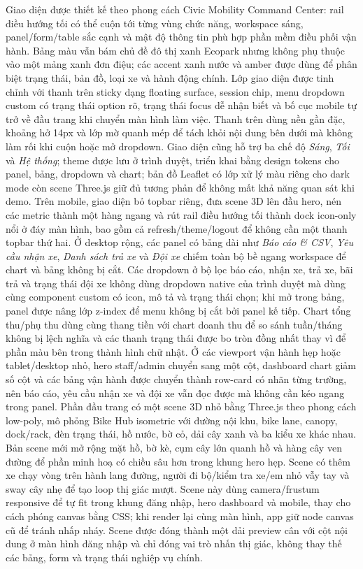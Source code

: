 Giao diện được thiết kế theo phong cách Civic Mobility Command Center: rail điều
hướng tối có thể cuộn tới từng vùng chức năng, workspace sáng, panel/form/table
sắc cạnh và mật độ thông tin phù hợp phần mềm điều phối vận hành. Bảng màu vẫn
bám chủ đề đô thị xanh Ecopark nhưng
không phụ thuộc vào một mảng xanh đơn điệu; các accent xanh nước và amber được
dùng để phân biệt trạng thái, bản đồ, loại xe và hành động chính. Lớp giao diện
được tinh chỉnh với thanh trên sticky dạng floating surface, session chip, menu
dropdown custom có trạng thái option rõ, trạng thái focus dễ nhận biết và bố cục
mobile tự trở về đầu trang khi chuyển màn hình làm việc. Thanh trên dùng nền gần
đặc, khoảng hở 14px và lớp mờ quanh mép để tách khỏi nội dung bên dưới mà không
làm rối khi cuộn hoặc mở dropdown. Giao diện cũng hỗ trợ ba chế độ \textit{Sáng}, \textit{Tối} và
\textit{Hệ thống}; theme được lưu ở trình duyệt, triển khai bằng design tokens
cho panel, bảng, dropdown và chart; bản đồ Leaflet có lớp xử lý màu riêng cho
dark mode còn scene Three.js giữ đủ tương phản để không mất khả năng quan sát khi demo. Trên mobile,
giao diện bỏ topbar riêng,
đưa scene 3D lên đầu hero, nén các metric thành một hàng ngang và rút rail điều
hướng tối thành dock icon-only nổi ở đáy màn hình, bao gồm cả refresh/theme/logout
để không cần một thanh topbar thứ hai. Ở desktop rộng, các panel có bảng dài như
\textit{Báo cáo \& CSV}, \textit{Yêu cầu nhận xe}, \textit{Danh sách trả xe} và
\textit{Đội xe} chiếm toàn bộ bề ngang workspace để chart và bảng không bị cắt.
Các dropdown ở bộ lọc báo cáo, nhận xe, trả xe, bãi trả và trạng thái đội xe
không dùng dropdown native của trình duyệt mà dùng cùng component custom có icon,
mô tả và trạng thái chọn; khi mở trong bảng, panel được nâng lớp z-index để menu
không bị cắt bởi panel kế tiếp. Chart tổng thu/phụ thu dùng cùng thang tiền với
chart doanh thu để so sánh tuần/tháng không bị lệch nghĩa và các thanh trạng thái
được bo tròn đồng nhất thay vì để phần màu bên trong thành hình chữ nhật.
Ở các viewport vận hành hẹp hoặc tablet/desktop nhỏ, hero staff/admin chuyển
sang một cột, dashboard chart giảm số cột và các bảng vận hành được chuyển thành
row-card có nhãn từng trường, nên báo cáo, yêu cầu nhận xe và đội xe vẫn đọc được
mà không cần kéo ngang trong panel. Phần đầu trang có một scene 3D nhỏ bằng
Three.js theo phong cách low-poly, mô phỏng Bike Hub isometric với đường nội khu,
bike lane, canopy, dock/rack, đèn trạng thái, hồ nước, bờ cỏ, dải cây xanh và ba
kiểu xe khác nhau. Bản scene mới mở rộng mặt hồ, bờ kè, cụm cây lớn quanh hồ và
hàng cây ven đường để phần minh hoạ có chiều sâu hơn trong khung hero hẹp. Scene
có thêm xe chạy vòng trên hành lang đường, người đi
bộ/kiểm tra xe/em nhỏ vẫy tay và sway cây nhẹ để tạo loop thị giác mượt. Scene
này dùng camera/frustum responsive để tự fit trong khung đăng nhập, hero dashboard
và mobile, thay cho cách phóng canvas bằng CSS; khi render lại cùng màn hình, app
giữ node canvas cũ để tránh nhấp nháy. Scene được đóng thành một dải preview cân
với cột nội dung ở màn hình đăng nhập và chỉ đóng vai trò nhấn thị giác, không
thay thế các bảng, form và trạng thái nghiệp vụ chính.

